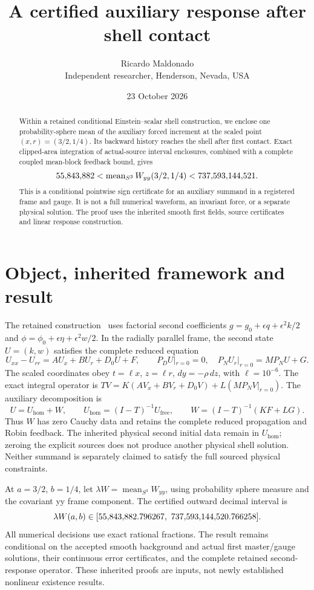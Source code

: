 \documentclass[11pt]{article}
\title{A certified auxiliary response after shell contact}
\author{Ricardo Maldonado\\\small Independent researcher, Henderson, Nevada, USA}
\date{23 October 2026}
\begin{document}
\maketitle
\begin{abstract}
Within a retained conditional Einstein--scalar shell construction, we enclose
one probability-sphere mean of the auxiliary forced increment at the scaled
point $(x,r)=(3/2,1/4)$. Its backward history reaches the shell after first
contact. Exact clipped-area integration of actual-source interval enclosures,
combined with a complete coupled mean-block feedback bound, gives
\[
55{,}843{,}882<\operatorname{mean}_{S^3}W_{yy}(3/2,1/4)<737{,}593{,}144{,}521.
\]
This is a conditional pointwise sign certificate for an auxiliary summand in
a registered frame and gauge. It is not a full numerical waveform, an
invariant force, or a separate physical solution. The proof uses the inherited
smooth first fields, source certificates and linear response construction.
\end{abstract}

\section{Object, inherited framework and result}
The retained construction~\cite{construction,forced} uses factorial second
coefficients $g=g_0+\epsilon q+\epsilon^2k/2$ and
$\phi=\phi_0+\epsilon\eta+\epsilon^2w/2$. In the radially parallel frame,
the second state $U=(k,w)$ satisfies the complete reduced equation
\[
U_{xx}-U_{rr}=A U_x+B U_r+D_0U+F,\qquad
P_DU|_{r=0}=0,\quad P_NU_r|_{r=0}=MP_NU+G.
\]
The scaled coordinates obey $t=\ell x$, $z=\ell r$,
$dy=-\rho\,dz$, with $\ell=10^{-6}$. The exact integral operator is
$TV=K(AV_x+BV_r+D_0V)+L(MP_NV|_{r=0})$.
The auxiliary decomposition is
\[
U=U_{\mathrm{hom}}+W,\qquad
U_{\mathrm{hom}}=(I-T)^{-1}U_{\mathrm{free}},\qquad
W=(I-T)^{-1}(KF+LG).
\]
Thus $W$ has zero Cauchy data and retains the complete reduced propagation
and Robin feedback. The inherited physical second initial data remain in
$U_{\mathrm{hom}}$; zeroing the explicit sources does not produce another
physical shell solution. Neither summand is separately claimed to satisfy
the full sourced physical constraints.

At $a=3/2$, $b=1/4$, let $\lambda W=\operatorname{mean}_{S^3}W_{yy}$,
using probability sphere measure and the covariant yy frame component.
The certified outward decimal interval is
\begin{equation}\label{eq:result}
\lambda W(a,b)\in[55{,}843{,}882.796267,\ 737{,}593{,}144{,}520.766258].
\end{equation}
All numerical decisions use exact rational fractions. The result remains
conditional on the accepted smooth background and actual first master/gauge
solutions, their continuous error certificates, and the complete retained
second-response operator. These inherited proofs are inputs, not newly
established nonlinear existence results.
\end{document}

